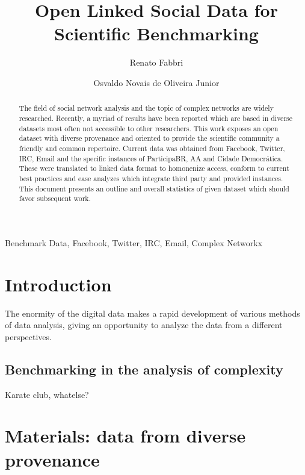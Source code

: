 \documentclass[review]{elsarticle}
\begin{document}
%
\begin{frontmatter}
%
\title{Open Linked Social Data for Scientific Benchmarking}
%
\author[pwr]{Renato Fabbri}
%
\author[pwr]{Osvaldo Novais de Oliveira Junior}
%
\address[pwr]{S\~ao Carlos Institute of Physics, S\~ao Paulo
University, Brazil}
%
%
\begin{abstract}
The field of social network analysis and the topic of complex networks
are widely researched.
Recently, a myriad of results have been reported which are based in
diverse datasets most often not accessible to other researchers.
This work exposes an open dataset with diverse provenance and oriented
to provide the scientific community a friendly and common repertoire.
Current data was obtained from Facebook, Twitter, IRC, Email and the specific
instances of ParticipaBR, AA and Cidade Democr\'atica.
These were translated to linked data format to homonenize access,
conform to current best practices and ease analyzes which integrate third
party and provided instances.
This document presents an outline and overall statistics of given
dataset which should favor subsequent work.
\end{abstract}
%
\begin{keyword}
Benchmark Data, Facebook, Twitter, IRC, Email, Complex Networkx
\end{keyword}

\end{frontmatter}

\section{Introduction}
The enormity of the digital data makes a rapid development of various methods of data analysis,
giving an opportunity to analyze the data from a different perspectives.

\subsection{Benchmarking in the analysis of complexity}
%
Karate club, whatelse?

\section{Materials: data from diverse provenance}
\end{document}
